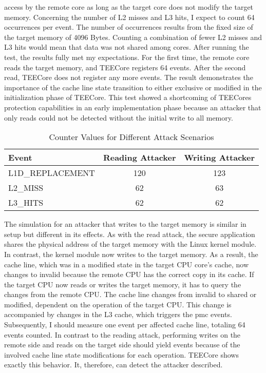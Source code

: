 access by the remote core as long as the target core does not modify the target
memory. Concerning the number of L2 misses and L3 hits, I expect to count 64
occurrences per event. The number of occurrences results from the fixed size of
the target memory of 4096 Bytes. Counting a combination of fewer L2 misses and
L3 hits would mean that data was not shared among cores. After running the test,
the results fully met my expectations. For the first time, the remote core reads
the target memory, and TEECore registers 64 events. After the second read,
TEECore does not register any more events. The result demonstrates the
importance of the cache line state transition to either exclusive or modified in
the initialization phase of TEECore. This test showed a shortcoming of TEECores
protection capabilities in an early implementation phase because an attacker
that only reads could not be detected without the initial write to all memory.\\

\begin{table}[ht]
  \centering
  \begin{tabular}{ |l||c|c| }
    \hline
    Event            & Reading Attacker & Writing Attacker \\
    \hline
    L1D\_REPLACEMENT & 120              & 123  \\
    L2\_MISS         & 62               & 63  \\
    L3\_HITS         & 62               & 62  \\
    \hline
  \end{tabular}
  \caption{Counter Values for Different Attack Scenarios}
  \label{50:tab:attacks}
\end{table}

The simulation for an attacker that writes to the target memory is similar in
setup but different in its effects. As with the read attack, the secure
application shares the physical address of the target memory with the Linux
kernel module. In contrast, the kernel module now writes to the target memory.
As a result, the cache line, which was in a modified state in the target CPU
core's cache, now changes to invalid because the remote CPU has the correct copy
in its cache. If the target CPU now reads or writes the target memory, it has to
query the changes from the remote CPU. The cache line changes from invalid to
shared or modified, dependent on the operation of the target CPU. This change is
accompanied by changes in the L3 cache, which triggers the \gls{pmc} events.
Subsequently, I should measure one event per affected cache line, totaling 64
events counted. In contrast to the reading attack, performing writes on the
remote side and reads on the target side should yield events because of the
involved cache line state modifications for each operation. TEECore shows
exactly this behavior. It, therefore, can detect the attacker described.\\


